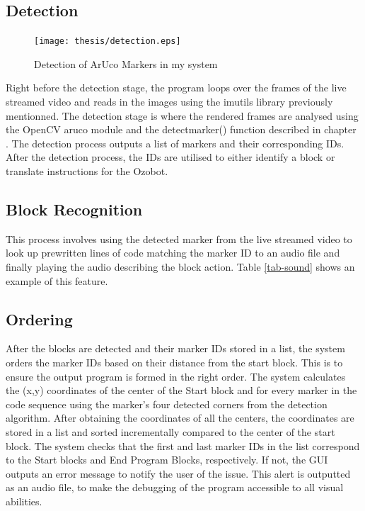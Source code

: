 \documentclass[oneside,%
                    author={Malak Hajji},
                    degree={BSc},
                    title={Designing An Accessible Ozobot Programming Platform for Students},
                  subtitle={With Mixed Visual Abilities}]{dissertation}
\begin{document}
\subsection{Detection} 
\FloatBarrier
\begin{figure}[h]
    \centering
    \texttt{[image: thesis/detection.eps]}
    \caption{Detection of ArUco Markers in my system}
    \label{fig-detection}
\end{figure}
\FloatBarrier
Right before the detection stage, the program loops over the frames of the live streamed video and reads in the images using the imutils library previously mentionned. The detection stage is where the rendered frames are analysed using the OpenCV aruco module and the detectmarker() function described in chapter . 
The detection process outputs a list of markers and their corresponding IDs. 
After the detection process, the IDs are utilised to either identify a block or translate instructions for the Ozobot. 
 
\subsection{Block Recognition}
 
This process involves using the detected marker from the live streamed video to look up prewritten lines of code matching the marker ID to an audio file and finally playing the audio describing the block action. Table \ref{tab-sound} shows an example of this feature.

\subsection{Ordering} 
 
After the blocks are detected and their marker IDs stored in a list, the system orders the marker IDs based on their distance from the start block. This is to ensure the output program is formed in the right order. The system calculates the (x,y) coordinates of the center of the Start block and for every marker in the code sequence using the marker's four detected corners from the detection algorithm. After obtaining the coordinates of all the centers, the coordinates are stored in a list and sorted incrementally compared to the center of the start block. 
The system checks that the first and last marker IDs in the list correspond to the Start blocks and End Program Blocks, respectively. If not, the GUI outputs an error message to notify the user of the issue. This alert is outputted as an audio file, to make the debugging of the program accessible to all visual abilities.  
\end{document}
